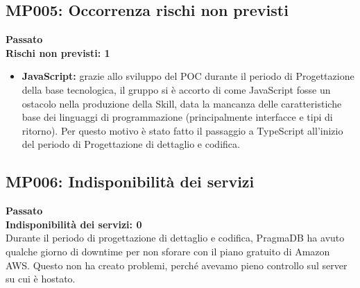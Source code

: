 \subsection{MP005:  Occorrenza rischi non previsti}
\textbf{Passato}\\
\textbf{Rischi non previsti: 1}
\begin{itemize}
	\item \textbf{JavaScript:} grazie allo sviluppo del POC durante il periodo di Progettazione della base tecnologica, il gruppo si è accorto di come JavaScript fosse un ostacolo nella produzione della Skill, data la mancanza delle caratteristiche base dei linguaggi di programmazione (principalmente interfacce e tipi di ritorno). Per questo motivo è stato fatto il passaggio a TypeScript all'inizio del periodo di Progettazione di dettaglio e codifica. 
\end{itemize}

\subsection{MP006: Indisponibilità dei servizi}
\textbf{Passato}\\
\textbf{Indisponibilità dei servizi: 0}\\
Durante il periodo di progettazione di dettaglio e codifica, PragmaDB ha avuto qualche giorno di downtime per non sforare con il piano gratuito di Amazon AWS. Questo non ha creato problemi, perché avevamo pieno controllo sul server su cui è hostato. \\

